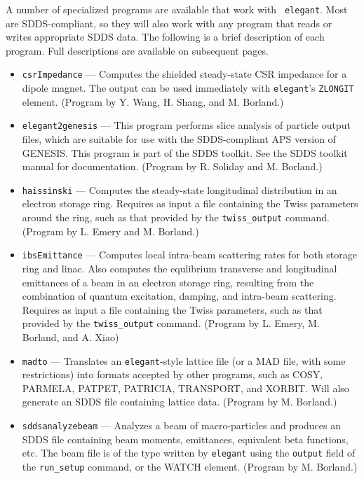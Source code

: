 \documentclass[11pt]{article}
\begin{document}
A number of specialized programs are available that work with {\tt
elegant}. Most are SDDS-compliant, so they will also work with any
program that reads or writes appropriate SDDS data.  The following is
a brief description of each program.  Full descriptions are available
on subsequent pages.
\begin{itemize}
\item {\tt csrImpedance} --- Computes the shielded steady-state CSR impedance for a dipole magnet.
 The output can be used immediately with {\tt elegant}'s \verb|ZLONGIT| element.
 (Program by Y. Wang, H. Shang, and M. Borland.)
\item {\tt elegant2genesis} --- This program performs
        slice analysis of particle output files, which are suitable for use with
        the SDDS-compliant APS version of GENESIS\cite{GENESIS}.  This program is
        part of the SDDS toolkit.  See the SDDS toolkit
        manual for documentation. (Program by R. Soliday and M. Borland.)
\item {\tt haissinski} --- Computes the steady-state longitudinal distribution in
        an electron storage ring.  Requires as input a file containing the Twiss
        parameters around the ring, such as that provided by the \verb|twiss_output| command.
        (Program by L. Emery and M. Borland.)
\item {\tt ibsEmittance} --- Computes local intra-beam scattering rates for both storage ring
        and linac. Also computes the equlibrium transverse and longitudinal emittances of a 
        beam in an electron storage ring, resulting from the combination of quantum excitation,
        damping, and intra-beam scattering.  Requires as input a file containing the
        Twiss parameters, such as that provided by the \verb|twiss_output| command.
        (Program by L. Emery, M. Borland, and A. Xiao)
\item {\tt madto} --- Translates an {\tt elegant}-style lattice file (or a MAD file, with
        some restrictions) into formats accepted by other programs, such as COSY, PARMELA, 
        PATPET, PATRICIA, TRANSPORT, and XORBIT.  Will also generate an SDDS file containing lattice
        data.  (Program by M. Borland.)
\item {\tt sddsanalyzebeam} --- Analyzes a beam of macro-particles and produces an SDDS file
        containing beam moments, emittances, equivalent beta functions, etc.  The beam file
        is of the type written by {\tt elegant} using the {\tt output} field of the {\tt run\_setup}
        command, or the WATCH element.  (Program by M. Borland.)

\end{itemize}
\end{document}
